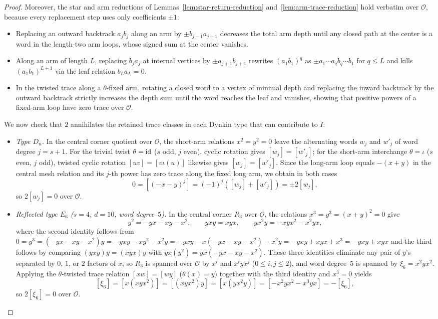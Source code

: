 \begin{proof}
Moreover, the star and arm reductions of Lemmas~\ref{lem:star-return-reduction} and~\ref{lem:arm-trace-reduction} hold verbatim over $\mathcal O$, because every replacement step uses only coefficients $\pm1$:
\begin{itemize}
\item Replacing an outward backtrack $a_j b_j$ along an arm by $\pm b_{j-1}a_{j-1}$ decreases the total arm depth until any closed path at the center is a word in the length-two arm loops, whose signed sum at the center vanishes.
\item Along an arm of length $L$, replacing $b_j a_j$ at internal vertices by $\pm a_{j+1}b_{j+1}$ rewrites $(a_1 b_1)^q$ as $\pm a_1\cdots a_q b_q\cdots b_1$ for $q\leq L$ and kills $(a_1 b_1)^{L+1}$ via the leaf relation $b_L a_L=0$.
\item In the twisted trace along a $\theta$-fixed arm, rotating a closed word to a vertex of minimal depth and replacing the inward backtrack by the outward backtrack strictly increases the depth sum until the word reaches the leaf and vanishes, showing that positive powers of a fixed-arm loop have zero trace over $\mathcal O$.
\end{itemize}

We now check that $2$ annihilates the retained trace classes in each Dynkin type that can contribute to $I$:
\begin{itemize}
\item \emph{Type $D_n$.} In the central corner quotient over $\mathcal O$, the short-arm relations $x^2=y^2=0$ leave the alternating words $w_j$ and $w'_j$ of word degree $j=s+1$. For the trivial twist $\theta=\operatorname{id}$ ($s$ odd, $j$ even), cyclic rotation gives $[w_j]=[w'_j]$; for the short-arm interchange $\theta=\iota$ ($s$ even, $j$ odd), twisted cyclic rotation $[uv]=[v\iota(u)]$ likewise gives $[w_j]=[w'_j]$. Since the long-arm loop equals $-(x+y)$ in the central mesh relation and its $j$-th power has zero trace along the fixed long arm, we obtain in both cases
\[
  0=[(-x-y)^j]=(-1)^j([w_j]+[w'_j])=\pm2[w_j],
\]
so $2[w_j]=0$ over $\mathcal O$.

\item \emph{Reflected type $E_6$ ($s=4$, $d=10$, word degree~$5$).} In the central corner $R_3$ over $\mathcal O$, the relations $x^3=y^3=(x+y)^2=0$ give
\[
  y^2=-yx-xy-x^2,\qquad yxy=xyx,\qquad yx^2y=-xyx^2-x^2yx,
\]
where the second identity follows from $0=y^3=(-yx-xy-x^2)y=-yxy-xy^2-x^2y=-yxy-x(-yx-xy-x^2)-x^2y=-yxy+xyx+x^3=-yxy+xyx$ and the third follows by comparing $(yxy)y=(xyx)y$ with $yx(y^2)=yx(-yx-xy-x^2)$. These three identities eliminate any pair of $y$'s separated by $0$, $1$, or $2$ factors of $x$, so $R_3$ is spanned over $\mathcal O$ by $x^i$ and $x^iyx^j$ ($0\leq i,j\leq2$), and word degree~$5$ is spanned by $\xi_6=x^2yx^2$. Applying the $\theta$-twisted trace relation $[xw]=[wy]$ ($\theta(x)=y$) together with the third identity and $x^3=0$ yields
\[
  [\xi_6]=[x(xyx^2)]=[(xyx^2)y]=[x(yx^2y)]=[-x^2yx^2-x^3yx]=-[\xi_6],
\]
so $2[\xi_6]=0$ over $\mathcal O$.


\end{itemize}
\end{proof}
